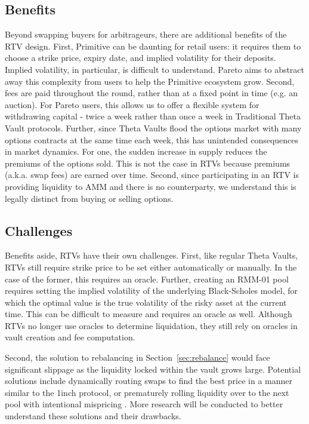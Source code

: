 \documentclass[hidelinks, 12pt]{article}
\begin{document}
\subsection{Benefits}

Beyond swapping buyers for arbitrageurs, there are additional benefits of the RTV design. First, Primitive can be daunting for retail users: it requires them to choose a strike price, expiry date, and implied volatility for their deposits. Implied volatility, in particular, is difficult to understand. Pareto aims to abstract away this complexity from users to help the Primitive ecosystem grow. Second, fees are paid throughout the round, rather than at a fixed point in time (e.g. an auction). For Pareto users, this allows us to offer a flexible system for withdrawing capital - twice a week rather than once a week in Traditional Theta Vault protocols. Further, since Theta Vaults flood the options market with many options contracts at the same time each week, this has unintended consequences in market dynamics. For one, the sudden increase in supply reduces the premiums of the options sold. This is not the case in RTVs because premiums (a.k.a. swap fees) are earned over time. Second, since participating in an RTV is providing liquidity to AMM and there is no counterparty, we understand this is legally distinct from buying or selling options.

\subsection{Challenges}
\label{Challenges}

Benefits aside, RTVs have their own challenges. First, like regular Theta Vaults, RTVs still require strike price to be set either automatically or manually. In the case of the former, this requires an oracle. Further, creating an RMM-01 pool requires setting the implied volatility of the underlying Black-Scholes model, for which the optimal value is the true volatility of the risky asset at the current time. This can be difficult to measure and requires an oracle as well. Although RTVs no longer use oracles to determine liquidation, they still rely on oracles in vault creation and fee computation.

Second, the solution to rebalancing in Section~\ref{sec:rebalance} would face significant slippage as the liquidity locked within the vault grows large. Potential solutions include dynamically routing swaps to find the best price in a manner similar to the 1inch protocol, or prematurely rolling liquidity over to the next pool with intentional mispricing \cite{sterrett2022replicating}. More research will be conducted to better understand these solutions and their drawbacks.
\end{document}
